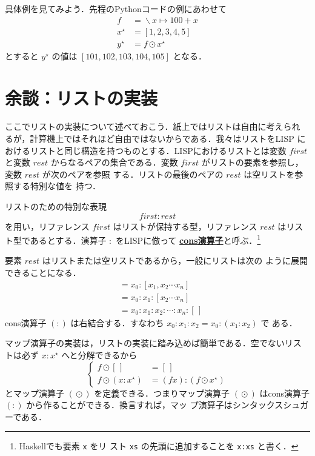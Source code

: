\documentclass[a5paper,twoside,fleqn,draft]{jsbook}
\newcommand{\TK}[1]{\mask{\textbf{TK:}~#1}{C}}
\newcommand{\programminglanguage}[1]{\textsf{#1}}
\newcommand{\haskell}{\programminglanguage{Haskell}}
\newcommand{\lisp}{\programminglanguage{LISP}}
\newcommand{\python}{\programminglanguage{Python}}
\newcommand{\keyword}[1]{{\underline{\textbf{#1}}}}
\newcommand{\code}[1]{\texttt{#1}}
\newcommand{\mEmptyList}{{[\,]}}
\newcommand{\mSpecialVar}[1]{\mathit{#1}}
\newcommand{\mFirstVar}{\mSpecialVar{first}}
\newcommand{\mRestVar}{\mSpecialVar{rest}}
\DeclareMathOperator{\mLambda}{\backslash}
\DeclareMathOperator{\mLambdaArrow}{\mapsto}
\DeclareMathOperator{\mMapList}{\odot}
\newcommand{\mList}[1]{{#1}^\mathrm{\star}}
\begin{document}
\TK{liftM}

具体例を見てみよう．先程の\python コードの例にあわせて
\begin{align}
  f
  &=\mLambda x\mLambdaArrow100+x\\
  \mList{x}
  &=[1,2,3,4,5]\\
  \mList{y}
  &=f\mMapList\mList{x}
\end{align}
とすると $\mList{y}$ の値は $[101,102,103,104,105]$ となる．

\section{余談：リストの実装}

ここでリストの実装について述べておこう．紙上ではリストは自由に考えられ
るが，計算機上ではそれほど自由ではないからである．我々はリストを\lisp
におけるリストと同じ構造を持つものとする．\lisp におけるリストとは変数
$\mFirstVar$ と変数 $\mRestVar$ からなるペアの集合である．変数
$\mFirstVar$ がリストの要素を参照し，変数 $\mRestVar$ が次のペアを参照
する．リストの最後のペアの $\mRestVar$ は空リストを参照する特別な値を
持つ．

リストのための特別な表現
\begin{equation}
  \mFirstVar:\mRestVar
\end{equation}
を用い，リファレンス $\mFirstVar$ はリストが保持する型，リファレンス
$\mRestVar$ はリスト型であるとする．演算子 $:$ を\lisp に倣って
\keyword{cons演算子}と呼ぶ．\footnote{\haskell でも要素 \code{x} をリ
  スト \code{xs} の先頭に追加することを \code{x:xs} と書く．}

要素 $\mRestVar$ はリストまたは空リストであるから，一般にリストは次の
ように展開できることになる．
\begin{align}
  [x_0,x_1,x_2\dotsb x_n]
  &=x_0:[x_1,x_2\dotsb x_n]\\
  &=x_0:x_1:[x_2\dotsb x_n]\\
  &=x_0:x_1:x_2:\dotsb:x_n:\mEmptyList
\end{align}
cons演算子 $(:)$ は右結合する．すなわち $x_0:x_1:x_2=x_0:(x_1:x_2)$ で
ある．

マップ演算子の実装は，リストの実装に踏み込めば簡単である．空でないリス
トは必ず $x:\mList{x}$ へと分解できるから
\begin{equation}
  \left\{
  \begin{aligned}
    f\mMapList\mEmptyList
    &=\mEmptyList\\
    f\mMapList{}(x:\mList{x})
    &=(fx):(f\mMapList\mList{x})
  \end{aligned}
  \right.
\end{equation}
とマップ演算子 $(\mMapList)$ を定義できる．つまりマップ演算子
$(\mMapList)$ はcons演算子 $(:)$ から作ることができる．換言すれば，マッ
プ演算子はシンタックスシュガーである．
\end{document}
